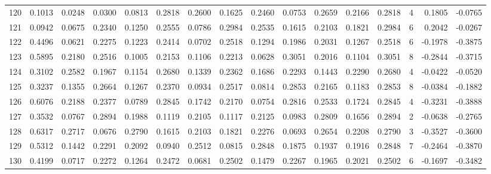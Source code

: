 \begin{tabular}{lrrrrrrrrrrrrrrr}
120 &      0.1013 &  0.0248 &  0.0300 &  0.0813 &  0.2818 &  0.2600 &  0.1625 &  0.2460 &  0.0753 &  0.2659 &   0.2166 &     0.2818 &      4 &                    0.1805 &                    -0.0765 \\
121 &      0.0942 &  0.0675 &  0.2340 &  0.1250 &  0.2555 &  0.0786 &  0.2984 &  0.2535 &  0.1615 &  0.2103 &   0.1821 &     0.2984 &      6 &                    0.2042 &                    -0.0267 \\
122 &      0.4496 &  0.0621 &  0.2275 &  0.1223 &  0.2414 &  0.0702 &  0.2518 &  0.1294 &  0.1986 &  0.2031 &   0.1267 &     0.2518 &      6 &                   -0.1978 &                    -0.3875 \\
123 &      0.5895 &  0.2180 &  0.2516 &  0.1005 &  0.2153 &  0.1106 &  0.2213 &  0.0628 &  0.3051 &  0.2016 &   0.1104 &     0.3051 &      8 &                   -0.2844 &                    -0.3715 \\
124 &      0.3102 &  0.2582 &  0.1967 &  0.1154 &  0.2680 &  0.1339 &  0.2362 &  0.1686 &  0.2293 &  0.1443 &   0.2290 &     0.2680 &      4 &                   -0.0422 &                    -0.0520 \\
125 &      0.3237 &  0.1355 &  0.2664 &  0.1267 &  0.2370 &  0.0934 &  0.2517 &  0.0814 &  0.2853 &  0.2165 &   0.1183 &     0.2853 &      8 &                   -0.0384 &                    -0.1882 \\
126 &      0.6076 &  0.2188 &  0.2377 &  0.0789 &  0.2845 &  0.1742 &  0.2170 &  0.0754 &  0.2816 &  0.2533 &   0.1724 &     0.2845 &      4 &                   -0.3231 &                    -0.3888 \\
127 &      0.3532 &  0.0767 &  0.2894 &  0.1988 &  0.1119 &  0.2105 &  0.1117 &  0.2125 &  0.0983 &  0.2809 &   0.1656 &     0.2894 &      2 &                   -0.0638 &                    -0.2765 \\
128 &      0.6317 &  0.2717 &  0.0676 &  0.2790 &  0.1615 &  0.2103 &  0.1821 &  0.2276 &  0.0693 &  0.2654 &   0.2208 &     0.2790 &      3 &                   -0.3527 &                    -0.3600 \\
129 &      0.5312 &  0.1442 &  0.2291 &  0.2092 &  0.0940 &  0.2512 &  0.0815 &  0.2848 &  0.1875 &  0.1937 &   0.1916 &     0.2848 &      7 &                   -0.2464 &                    -0.3870 \\
130 &      0.4199 &  0.0717 &  0.2272 &  0.1264 &  0.2472 &  0.0681 &  0.2502 &  0.1479 &  0.2267 &  0.1965 &   0.2021 &     0.2502 &      6 &                   -0.1697 &                    -0.3482 \\

\end{tabular}
